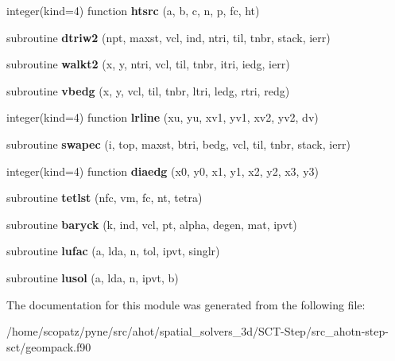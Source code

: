 \begin{DoxyCompactItemize}
\item 
\hypertarget{classgeompack_ac0a055d7534043b545b23cb09104b68e}{integer(kind=4) function {\bfseries htsrc} (a, b, c, n, p, fc, ht)}\label{classgeompack_ac0a055d7534043b545b23cb09104b68e}

\item 
\hypertarget{classgeompack_ac83af4943560085ee3f25b817aa45b9c}{subroutine {\bfseries dtriw2} (npt, maxst, vcl, ind, ntri, til, tnbr, stack, ierr)}\label{classgeompack_ac83af4943560085ee3f25b817aa45b9c}

\item 
\hypertarget{classgeompack_a25b0a5c22a744be77665e36e4a1062af}{subroutine {\bfseries walkt2} (x, y, ntri, vcl, til, tnbr, itri, iedg, ierr)}\label{classgeompack_a25b0a5c22a744be77665e36e4a1062af}

\item 
\hypertarget{classgeompack_a38c94eee465e80bf8838faf84fbecc0c}{subroutine {\bfseries vbedg} (x, y, vcl, til, tnbr, ltri, ledg, rtri, redg)}\label{classgeompack_a38c94eee465e80bf8838faf84fbecc0c}

\item 
\hypertarget{classgeompack_a9ad84c591ca6884ed9df315f68f3f30c}{integer(kind=4) function {\bfseries lrline} (xu, yu, xv1, yv1, xv2, yv2, dv)}\label{classgeompack_a9ad84c591ca6884ed9df315f68f3f30c}

\item 
\hypertarget{classgeompack_a55066c94f489f5a120f06c1f576e167f}{subroutine {\bfseries swapec} (i, top, maxst, btri, bedg, vcl, til, tnbr, stack, ierr)}\label{classgeompack_a55066c94f489f5a120f06c1f576e167f}

\item 
\hypertarget{classgeompack_aa309a784a534b06779c17338510e1d7e}{integer(kind=4) function {\bfseries diaedg} (x0, y0, x1, y1, x2, y2, x3, y3)}\label{classgeompack_aa309a784a534b06779c17338510e1d7e}

\item 
\hypertarget{classgeompack_a4ea8209ecfbd40ef48d79302d930352f}{subroutine {\bfseries tetlst} (nfc, vm, fc, nt, tetra)}\label{classgeompack_a4ea8209ecfbd40ef48d79302d930352f}

\item 
\hypertarget{classgeompack_ac332e0faf391cc194c70cfc300de1059}{subroutine {\bfseries baryck} (k, ind, vcl, pt, alpha, degen, mat, ipvt)}\label{classgeompack_ac332e0faf391cc194c70cfc300de1059}

\item 
\hypertarget{classgeompack_aa3c5e87b0e2e939bb490bb9591939213}{subroutine {\bfseries lufac} (a, lda, n, tol, ipvt, singlr)}\label{classgeompack_aa3c5e87b0e2e939bb490bb9591939213}

\item 
\hypertarget{classgeompack_a4b68a0623aa709973fa045f833408ce4}{subroutine {\bfseries lusol} (a, lda, n, ipvt, b)}\label{classgeompack_a4b68a0623aa709973fa045f833408ce4}

\end{DoxyCompactItemize}


The documentation for this module was generated from the following file\-:\begin{DoxyCompactItemize}
\item 
/home/scopatz/pyne/src/ahot/spatial\-\_\-solvers\-\_\-3d/\-S\-C\-T-\/\-Step/src\-\_\-ahotn-\/step-\/sct/geompack.\-f90\end{DoxyCompactItemize}
